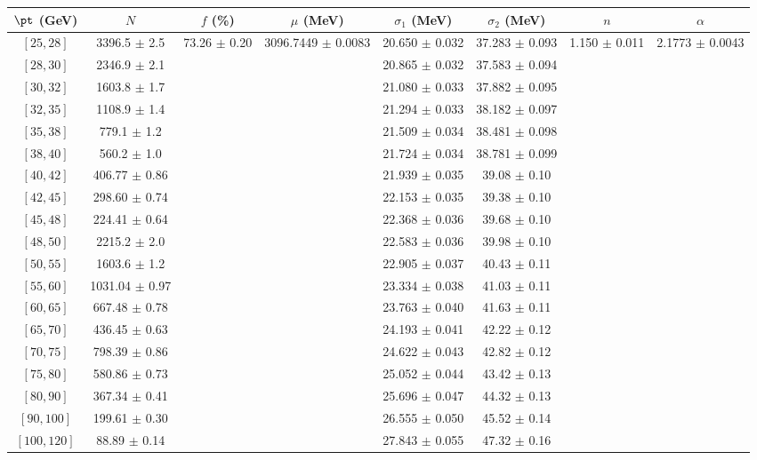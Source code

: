 \begin{tabular}{c||c|c|c|c|c|c|c}
$\pt$ (GeV) & $N$ & $f$ (\%) & $\mu$ (MeV) & $\sigma_1$ (MeV) & $\sigma_2$ (MeV) & $n$ & $\alpha$ \\
\hline
$[25, 28]$ & 3396.5 $\pm$ 2.5 & \multirow{19}{*}{73.26 $\pm$ 0.20} & \multirow{19}{*}{3096.7449 $\pm$ 0.0083} & 20.650 $\pm$ 0.032 & 37.283 $\pm$ 0.093 & \multirow{19}{*}{1.150 $\pm$ 0.011} & \multirow{19}{*}{2.1773 $\pm$ 0.0043}\\
$[28, 30]$ & 2346.9 $\pm$ 2.1 &  &  & 20.865 $\pm$ 0.032 & 37.583 $\pm$ 0.094 &  & \\
$[30, 32]$ & 1603.8 $\pm$ 1.7 &  &  & 21.080 $\pm$ 0.033 & 37.882 $\pm$ 0.095 &  & \\
$[32, 35]$ & 1108.9 $\pm$ 1.4 &  &  & 21.294 $\pm$ 0.033 & 38.182 $\pm$ 0.097 &  & \\
$[35, 38]$ & 779.1 $\pm$ 1.2 &  &  & 21.509 $\pm$ 0.034 & 38.481 $\pm$ 0.098 &  & \\
$[38, 40]$ & 560.2 $\pm$ 1.0 &  &  & 21.724 $\pm$ 0.034 & 38.781 $\pm$ 0.099 &  & \\
$[40, 42]$ & 406.77 $\pm$ 0.86 &  &  & 21.939 $\pm$ 0.035 & 39.08 $\pm$ 0.10 &  & \\
$[42, 45]$ & 298.60 $\pm$ 0.74 &  &  & 22.153 $\pm$ 0.035 & 39.38 $\pm$ 0.10 &  & \\
$[45, 48]$ & 224.41 $\pm$ 0.64 &  &  & 22.368 $\pm$ 0.036 & 39.68 $\pm$ 0.10 &  & \\
$[48, 50]$ & 2215.2 $\pm$ 2.0 &  &  & 22.583 $\pm$ 0.036 & 39.98 $\pm$ 0.10 &  & \\
$[50, 55]$ & 1603.6 $\pm$ 1.2 &  &  & 22.905 $\pm$ 0.037 & 40.43 $\pm$ 0.11 &  & \\
$[55, 60]$ & 1031.04 $\pm$ 0.97 &  &  & 23.334 $\pm$ 0.038 & 41.03 $\pm$ 0.11 &  & \\
$[60, 65]$ & 667.48 $\pm$ 0.78 &  &  & 23.763 $\pm$ 0.040 & 41.63 $\pm$ 0.11 &  & \\
$[65, 70]$ & 436.45 $\pm$ 0.63 &  &  & 24.193 $\pm$ 0.041 & 42.22 $\pm$ 0.12 &  & \\
$[70, 75]$ & 798.39 $\pm$ 0.86 &  &  & 24.622 $\pm$ 0.043 & 42.82 $\pm$ 0.12 &  & \\
$[75, 80]$ & 580.86 $\pm$ 0.73 &  &  & 25.052 $\pm$ 0.044 & 43.42 $\pm$ 0.13 &  & \\
$[80, 90]$ & 367.34 $\pm$ 0.41 &  &  & 25.696 $\pm$ 0.047 & 44.32 $\pm$ 0.13 &  & \\
$[90, 100]$ & 199.61 $\pm$ 0.30 &  &  & 26.555 $\pm$ 0.050 & 45.52 $\pm$ 0.14 &  & \\
$[100, 120]$ & 88.89 $\pm$ 0.14 &  &  & 27.843 $\pm$ 0.055 & 47.32 $\pm$ 0.16 &  & \\
\end{tabular}

